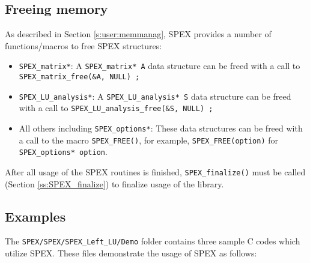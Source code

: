 \documentclass[12pt]{report}
\theoremstyle{definition}
\begin{document}
\cprotect\subsection{Freeing memory}
\label{s:Using:free}

As described in Section \ref{s:user:memmanag}, SPEX provides a number
of functions/macros to free SPEX structures:

\begin{itemize}
\item \verb|SPEX_matrix*|: A \verb|SPEX_matrix* A| data structure can be freed
with a call to \verb|SPEX_matrix_free(&A, NULL) ;|

\item \verb|SPEX_LU_analysis*|: A \verb|SPEX_LU_analysis* S| data structure can
be freed with a call to \verb|SPEX_LU_analysis_free(&S, NULL) ;|

\item All others including \verb|SPEX_options*|: These data structures can be
freed with a call to the macro \verb|SPEX_FREE()|, for example,
\verb|SPEX_FREE(option)| for \newline
\verb|SPEX_options* option|.

\end{itemize}

After all usage of the SPEX routines is finished, \verb|SPEX_finalize()|
must be called (Section \ref{ss:SPEX_finalize}) to finalize usage of the
library.

\cprotect\subsection{Examples}
\label{s:Using:Examples}

The \verb|SPEX/SPEX/SPEX_Left_LU/Demo| folder contains three sample C codes
which utilize SPEX. These files demonstrate the usage of SPEX as
follows:
\end{document}
